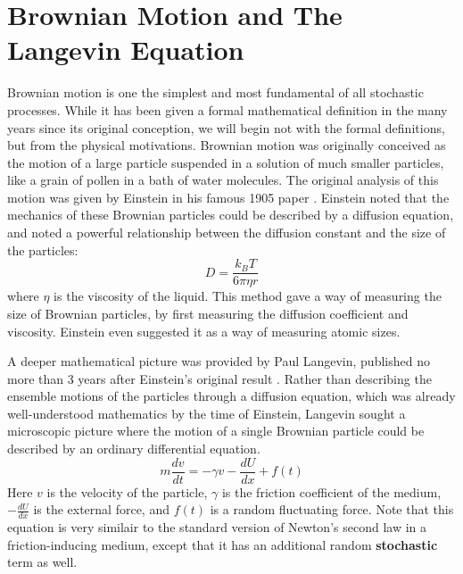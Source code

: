 \documentclass[11pt, oneside]{article}   	%
\begin{document}

\section{Brownian Motion and The Langevin Equation}

    Brownian motion is one the simplest and most fundamental of all stochastic processes. While it has been given a formal mathematical definition in the many years since its original conception, we will begin not with the formal definitions, but from the physical motivations. Brownian motion was originally conceived as the motion of a large particle suspended in a solution of much smaller particles, like a grain of pollen in a bath of water molecules. The original analysis of this motion was given by Einstein in his famous 1905 paper \cite{Einstein}. Einstein noted that the mechanics of these Brownian particles could be described by a diffusion equation, and noted a powerful relationship between the diffusion constant and the size of the particles:
    \begin{equation}
        \label{eq:stokes_einstein}
        D = \frac{k_B T}{6\pi \eta r}
    \end{equation}
    where $\eta$ is the viscosity of the liquid. This method gave a way of measuring the size of Brownian particles, by first measuring the diffusion coefficient and viscosity. Einstein even suggested it as a way of measuring atomic sizes. 
    
    A deeper mathematical picture was provided by Paul Langevin, published no more than 3 years after Einstein's original result \cite{Langevin}. Rather than describing the ensemble motions of the particles through a diffusion equation, which was already well-understood mathematics by the time of Einstein, Langevin sought a microscopic picture where the motion of a single Brownian particle could be described by an ordinary differential equation. 
    \begin{equation}
        \label{eq:langevin}
        m\frac{dv}{dt} = -\gamma v - \frac{dU}{dx} + f(t)
    \end{equation}
    Here $v$ is the velocity of the particle, $\gamma$ is the friction coefficient of the medium, $- \frac{dU}{dx}$ is the external force, and $f(t)$ is a random fluctuating force. Note that this equation is very similair to the standard version of Newton's second law in a friction-inducing medium, except that it has an additional random \textbf{stochastic} term as well. 
    
\end{document}
